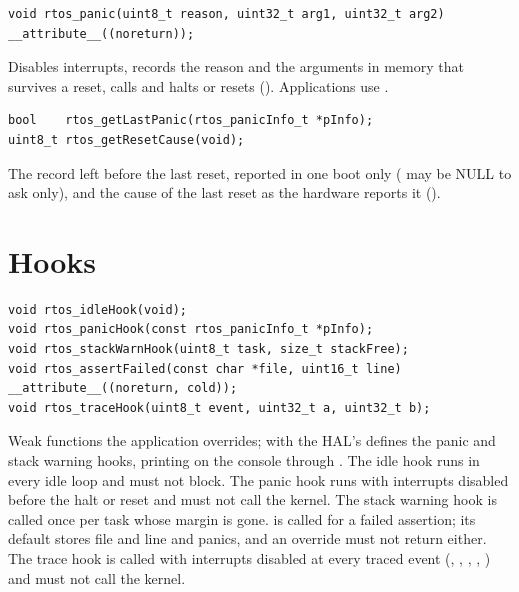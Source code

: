 \begin{lstlisting}
void rtos_panic(uint8_t reason, uint32_t arg1, uint32_t arg2) __attribute__((noreturn));
\end{lstlisting}
Disables interrupts, records the reason and the arguments in memory that survives a
reset, calls  and halts or resets ().
Applications use .

\begin{lstlisting}
bool    rtos_getLastPanic(rtos_panicInfo_t *pInfo);
uint8_t rtos_getResetCause(void);
\end{lstlisting}
The record left before the last reset, reported in one boot only ( may be
NULL to ask only), and the cause of the last reset as the hardware reports it
().

\section{Hooks}

\begin{lstlisting}
void rtos_idleHook(void);
void rtos_panicHook(const rtos_panicInfo_t *pInfo);
void rtos_stackWarnHook(uint8_t task, size_t stackFree);
void rtos_assertFailed(const char *file, uint16_t line) __attribute__((noreturn, cold));
void rtos_traceHook(uint8_t event, uint32_t a, uint32_t b);
\end{lstlisting}
Weak functions the application overrides; with  the HAL's
 defines the panic and stack warning hooks, printing on the console
through . The idle hook runs in every idle loop and
must not block. The panic hook runs with interrupts disabled before the halt or reset and
must not call the kernel. The stack warning hook is called once per task whose margin is
gone.  is called for a failed assertion; its default stores file
and line and panics, and an override must not return either. The trace hook is called
with interrupts disabled at every traced event (, ,
, , ) and must not call the kernel.


